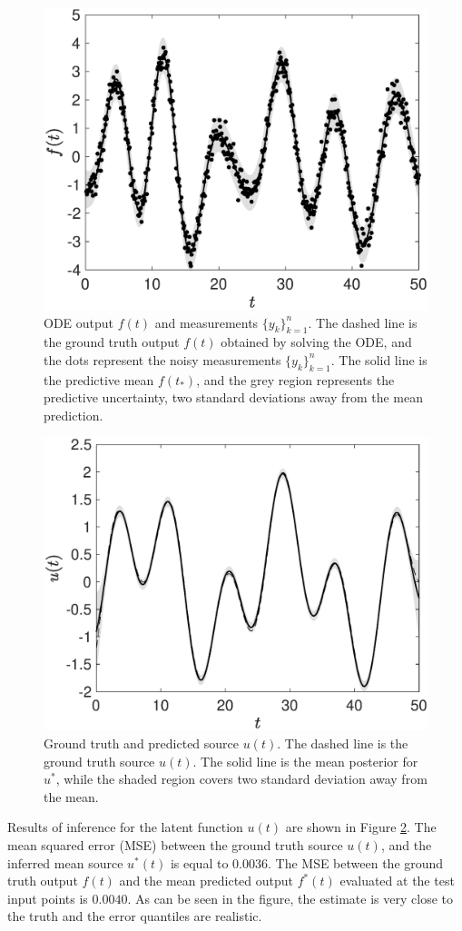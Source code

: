 \documentclass[journal]{IEEEtran}
\begin{document}
\begin{figure}[!ht]
\centering
       \includegraphics[width=0.7\columnwidth]{toyODE2output}
\caption{ODE output $f(t)$ and measurements $\{y_k\}_{k=1}^n$. The dashed line is the ground truth output $f(t)$
   obtained by solving the ODE, and the dots
   represent the noisy measurements $\{y_k\}_{k=1}^n$. The solid line is the predictive mean $f(t_*)$, and the grey
   region represents the predictive uncertainty, two standard deviations away from the mean prediction.\label{ode2:output:subfig:mlgp}}
\end{figure}

\begin{figure}[!ht]
\centering
       \includegraphics[width=0.7\columnwidth]{toyODE2source}
\caption{Ground truth and predicted source $u(t)$. The dashed line is the ground truth source $u(t)$. The solid
     line is the mean posterior for  $u^*$, while the shaded region covers two standard deviation away from the mean.\label{ode2:source:subfig:mlgp}}
\end{figure}

Results of inference for the latent function $u(t)$ are shown in Figure \ref{ode2:source:subfig:mlgp}. The mean squared error (MSE) between the ground truth source $u(t)$, and the inferred mean source $u^*(t)$ is equal to $0.0036$. The MSE between the ground truth output $f(t)$ and the mean predicted output $f^*(t)$ evaluated at the test input points is $0.0040$. As can be seen in the figure, the estimate is very close to the truth and the error quantiles are realistic.
\end{document}
